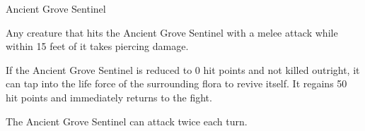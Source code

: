 \begin{DndMonster}[float*=b,width=\textwidth +8pt]{Ancient Grove Sentinel}
\begin{multicols}{2}
    Any creature that hits the Ancient Grove Sentinel with a melee attack while within 15 feet of it takes  piercing damage.
     
    If the Ancient Grove Sentinel is reduced to 0 hit points and not killed outright, it can tap into the life force of the surrounding flora to revive itself. It regains 50 hit points and immediately returns to the fight.
	
	
	The Ancient Grove Sentinel can attack twice each turn.
	
	\DndMonsterAttack[
      name=Slam,
      distance=melee, %
      mod=+12,
      reach=10,
      targets=one target,
      dmg=\DndDice{4d8 + 7},
      dmg-type=bludgeoning,
    ]
    
    \DndMonsterAttack[
      name=Vine Whip,
      distance=melee, %
      mod=+8,
      reach=20,
      targets=one target,
      dmg=\DndDice{3d8 + 5},
      dmg-type=bludgeoning,
      extra={. The target must succeed a DC 18 Strength saving throw or be pulled up to 10 feet toward the Sentinel. If the target is Large or smaller, it is also grappled}
    ]
	

\end{multicols}
\end{DndMonster}
